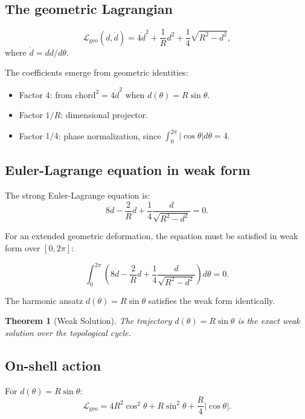 \documentclass[12pt]{article}
\numberwithin{equation}{section}
\newtheorem{theorem}{Theorem}[section]
\begin{document}
\subsection{The geometric Lagrangian}

\[
\boxed{\mathcal{L}_{\text{geo}}(d, \dot{d}) = 4\dot{d}^2 + \frac{1}{R}d^2 + \frac{1}{4}\sqrt{R^2 - d^2}},
\]
where \(\dot{d} = dd/d\theta\).

The coefficients emerge from geometric identities:
\begin{itemize}
    \item Factor 4: from \(\text{chord}^2 = 4\dot{d}^2\) when \(d(\theta) = R\sin\theta\).
    \item Factor \(1/R\): dimensional projector.
    \item Factor \(1/4\): phase normalization, since \(\int_0^{2\pi}|\cos\theta|d\theta = 4\).
\end{itemize}

\subsection{Euler-Lagrange equation in weak form}

The strong Euler-Lagrange equation is:
\begin{equation}\label{eq:euler_strong}
8\ddot{d} - \frac{2}{R}d + \frac{1}{4}\frac{d}{\sqrt{R^2-d^2}} = 0.
\end{equation}

For an extended geometric deformation, the equation must be satisfied in weak form over \([0, 2\pi]\):

\begin{equation}\label{eq:euler_weak}
\int_0^{2\pi} \left( 8\ddot{d} - \frac{2}{R}d + \frac{1}{4}\frac{d}{\sqrt{R^2-d^2}} \right) d\theta = 0.
\end{equation}

The harmonic ansatz \(d(\theta) = R\sin\theta\) satisfies the weak form identically.

\begin{theorem}[Weak Solution]\label{thm:weak}
The trajectory \(d(\theta) = R\sin\theta\) is the exact weak solution over the topological cycle.
\end{theorem}

\subsection{On-shell action}

For \(d(\theta) = R\sin\theta\):
\[
\mathcal{L}_{\text{geo}} = 4R^2\cos^2\theta + R\sin^2\theta + \frac{R}{4}|\cos\theta|.
\]
\end{document}
